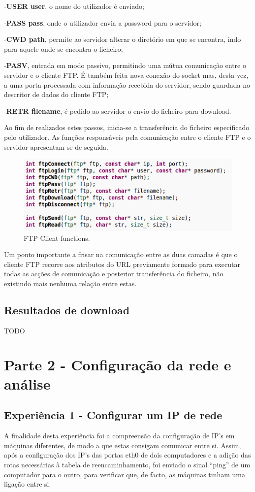 \documentclass[a4paper]{article}
\begin{document}
 -\textbf{USER user}, o nome do utilizador é enviado;
 
 -\textbf{PASS pass}, onde o utilizador envia a password para o servidor;
 
 -\textbf{CWD path}, permite ao servidor alterar o diretório em que se encontra, indo para aquele onde se encontra o ficheiro;
 
 -\textbf{PASV}, entrada em modo passivo, permitindo uma mútua comunicação entre o servidor e o cliente FTP. É também feita nova conexão do socket mas, desta vez, a uma porta processada com informação recebida do servidor, sendo guardada no descritor de dados do cliente FTP;
 
 -\textbf{RETR filename}, é pedido ao servidor o envio do ficheiro para download.
 
Ao fim de realizados estes passos, inicia-se a transferência do ficheiro especificado pelo utilizador. As funções responsáveis pela comunicação entre o cliente FTP e o servidor apresentam-se de seguida.

\begin{figure}[h!]
\centering
\includegraphics[scale=0.5]{res/ftp-functions.png}
\caption{FTP Client functions.}
\end{figure}

Um ponto importante a frisar na comunicação entre as duas camadas é que o cliente FTP recorre aos atributos do URL previamente formado para executar todas as acções de comunicação e posterior transferência do ficheiro, não existindo mais nenhuma relação entre estas.

\subsection{Resultados de download}
TODO

\section{Parte 2 - Configuração da rede e análise}
\subsection{Experiência 1 - Configurar um IP de rede}
A finalidade desta experiência foi a compreensão da configuração de IP’s em máquinas diferentes, de modo a que estas consigam comunicar entre si. Assim, após a configuração dos IP’s das portas eth0 de dois computadores e a adição das rotas necessárias à tabela de reencaminhamento, foi enviado o sinal “ping” de um computador para o outro, para verificar que, de facto, as máquinas tinham uma ligação entre si.
\end{document}
